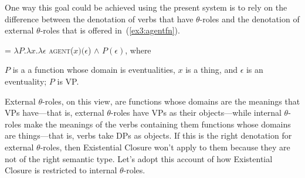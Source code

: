 One way this goal could be achieved using the present system is to rely on the difference between the denotation of verbs that have $\theta$-roles and the denotation of external $\theta$-roles that is offered in~(\ref{ex3:agentfn}). 
\begin{exe}
	 = $\lambda P.\lambda x.\lambda \epsilon$ \textsc{agent}($x)(\epsilon$) $\wedge$ $P(\epsilon)$, where
	\begin{xlist}
	\ex $P$ is a a function whose domain is eventualities, $x$ is a thing, and $\epsilon$ is an eventuality;
	\ex $P$ is VP.
	\end{xlist}
\end{exe}
External $\theta$-roles, on this view, are functions whose domains are the meanings that VPs have---that is, external $\theta$-roles have VPs as their objects---while internal $\theta$-roles make the meanings of the verbs containing them functions whose domains are things---that is, verbs take DPs as objects. If this is the right denotation for external $\theta$-roles, then Existential Closure won't apply to them because they are not of the right semantic type. Let's adopt this account of how Existential Closure is restricted to internal $\theta$-roles.

